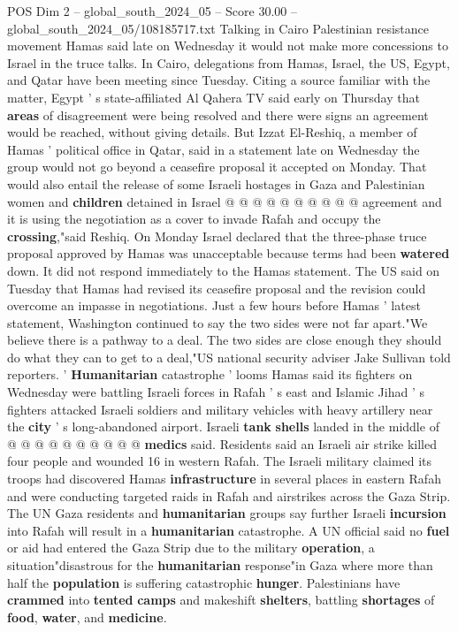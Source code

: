 \begin{textsample}{POS Dim 2 – global\_south\_2024\_05 – Score 30.00 – global\_south\_2024\_05/108185717.txt}
Talking in Cairo Palestinian resistance movement Hamas said late on Wednesday it would not make more concessions to Israel in the truce talks.
In Cairo, delegations from Hamas, Israel, the US, Egypt, and Qatar have been meeting since Tuesday.
Citing a source familiar with the matter, Egypt ' s state-affiliated Al Qahera TV said early on Thursday that \textbf{areas} of disagreement were being resolved and there were signs an agreement would be reached, without giving details.
But Izzat El-Reshiq, a member of Hamas ' political office in Qatar, said in a statement late on Wednesday the group would not go beyond a ceasefire proposal it accepted on Monday.
That would also entail the release of some Israeli hostages in Gaza and Palestinian women and \textbf{children} detained in Israel @ @ @ @ @ @ @ @ @ @ agreement and it is using the negotiation as a cover to invade Rafah and occupy the \textbf{crossing},"said Reshiq.
On Monday Israel declared that the three-phase truce proposal approved by Hamas was unacceptable because terms had been \textbf{watered} down.
It did not respond immediately to the Hamas statement.
The US said on Tuesday that Hamas had revised its ceasefire proposal and the revision could overcome an impasse in negotiations.
Just a few hours before Hamas ' latest statement, Washington continued to say the two sides were not far apart."We believe there is a pathway to a deal.
The two sides are close enough they should do what they can to get to a deal,"US national security adviser Jake Sullivan told reporters. ' \textbf{Humanitarian} catastrophe ' looms Hamas said its fighters on Wednesday were battling Israeli forces in Rafah ' s east and Islamic Jihad ' s fighters attacked Israeli soldiers and military vehicles with heavy artillery near the \textbf{city} ' s long-abandoned airport.
Israeli \textbf{tank} \textbf{shells} landed in the middle of @ @ @ @ @ @ @ @ @ @ \textbf{medics} said.
Residents said an Israeli air strike killed four people and wounded 16 in western Rafah.
The Israeli military claimed its troops had discovered Hamas \textbf{infrastructure} in several places in eastern Rafah and were conducting targeted raids in Rafah and airstrikes across the Gaza Strip.
The UN Gaza residents and \textbf{humanitarian} groups say further Israeli \textbf{incursion} into Rafah will result in a \textbf{humanitarian} catastrophe.
A UN official said no \textbf{fuel} or aid had entered the Gaza Strip due to the military \textbf{operation}, a situation"disastrous for the \textbf{humanitarian} response"in Gaza where more than half the \textbf{population} is suffering catastrophic \textbf{hunger}.
Palestinians have \textbf{crammed} into \textbf{tented} \textbf{camps} and makeshift \textbf{shelters}, battling \textbf{shortages} of \textbf{food}, \textbf{water}, and \textbf{medicine}.

\end{textsample}

